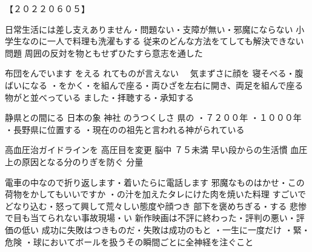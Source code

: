 \begin{multicols}{2}
【２０２２０６０５】\\
\end{multicols}

日常生活には差し支えありません・問題ない・支障が無い・邪魔にならない
小学生なのに一人で料理も洗濯もする
従来のどんな方法をてしても解決できない問題
周囲の反対を物ともせずひたすら意志を通した

布団をんでいます
をえる
れてものが言えない　
気まずさに顔を
寝そべる・腹ばいになる
・をかく・を組んで座る・両ひざを左右に開き、両足を組んで座る
物がと並べっている
ました・拝聴する・承知する

静県との間にる
日本の象
神社
のうつくしさ
県の
・７２００年
・１０００年
・長野県に位置する
・現在のの祖先と言われる神がられている

高血圧治ガイドラインを
高圧目を変更
脳中
７５未満
早い段からの生活慣
血圧上の原因となる分のりぎを防ぐ
分量

電車の中なので折り返します・着いたらに電話します
邪魔なものはかせ・この荷物をかしてもいいですか
・の汁を加えたタレにけた肉を焼いた料理
すごいでどなり込む・怒って興して荒々しい態度や顔つき
部下を褒めちぎる・する
悲惨で目も当てられない事故現場・い
新作映画は不評に終わった・評判の悪い・評価の低い
成功に失敗はつきものだ・失敗は成功のもと
・一生に一度だけ
・緊・危険
・球においてボールを扱うその瞬間ごとに全神経を注ぐこと

